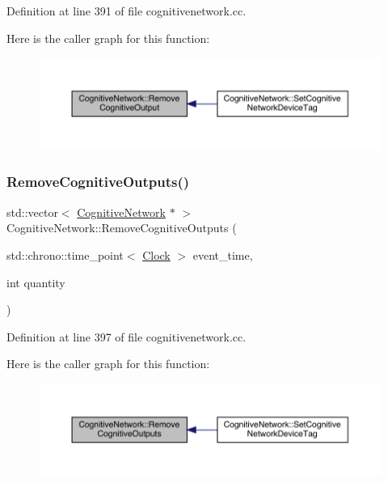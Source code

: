 Definition at line 391 of file cognitivenetwork.\+cc.

Here is the caller graph for this function\+:
\nopagebreak
\begin{figure}[H]
\begin{center}
\leavevmode
\includegraphics[width=350pt]{class_cognitive_network_a9874b11ac465c84ccf7baab0a40fb84e_icgraph}
\end{center}
\end{figure}
\mbox{\label{class_cognitive_network_a2f4956b004c828f0165f28c03e089144}} 
\subsubsection{\texorpdfstring{Remove\+Cognitive\+Outputs()}{RemoveCognitiveOutputs()}}
{\footnotesize\ttfamily std\+::vector$<$ \hyperlink{class_cognitive_network}{Cognitive\+Network} $\ast$ $>$ Cognitive\+Network\+::\+Remove\+Cognitive\+Outputs (\begin{DoxyParamCaption}\item[{std\+::chrono\+::time\+\_\+point$<$ \hyperlink{universe_8h_a0ef8d951d1ca5ab3cfaf7ab4c7a6fd80}{Clock} $>$}]{event\+\_\+time,  }\item[{int}]{quantity }\end{DoxyParamCaption})}



Definition at line 397 of file cognitivenetwork.\+cc.

Here is the caller graph for this function\+:
\nopagebreak
\begin{figure}[H]
\begin{center}
\leavevmode
\includegraphics[width=350pt]{class_cognitive_network_a2f4956b004c828f0165f28c03e089144_icgraph}
\end{center}
\end{figure}
\mbox{\label{class_cognitive_network_a04e38cea356f1c7ac31c4df5e19d759c}} 
